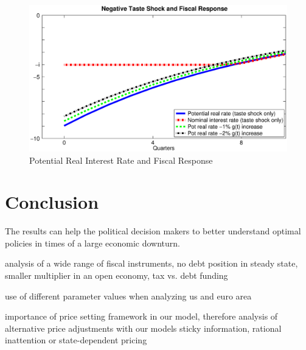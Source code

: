 \documentclass[12pt,a4paper,oneside,titlepage]{article}
\begin{document}
\begin{figure}[p]
\includegraphics[width=\textwidth]{Paperpics/Figure1a}
\caption{Potential Real Interest Rate and Fiscal Response}
\label{Figure1a}
\end{figure}








\section{Conclusion}
The results can help the political decision makers to better understand optimal policies in times of a large economic downturn.

analysis of a wide range of fiscal instruments, no debt position in steady state,  smaller multiplier in an open economy, tax vs. debt funding

use of different parameter values when analyzing us and euro area

importance of price setting framework in our model, therefore analysis of  alternative price adjustments with our models  sticky information, rational inattention or state-dependent pricing


\pagebreak[4]



\end{document}
